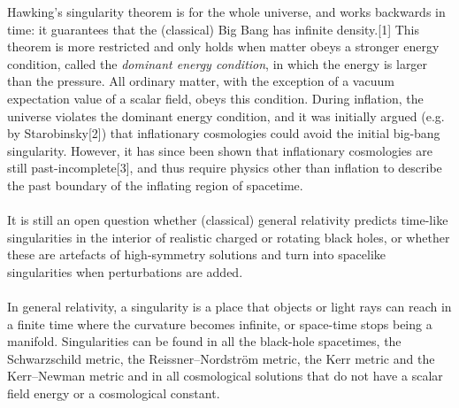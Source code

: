  Hawking's singularity theorem is for the whole universe, and works backwards in time: it guarantees that the (classical) Big Bang has infinite density.[1] This theorem is more restricted and only holds when matter obeys a stronger energy condition, called the \emph{dominant energy condition}, in which the energy is larger than the pressure. All ordinary matter, with the exception of a vacuum expectation value of a scalar field, obeys this condition. During inflation, the universe violates the dominant energy condition, and it was initially argued (e.g. by Starobinsky[2]) that inflationary cosmologies could avoid the initial big-bang singularity. However, it has since been shown that inflationary cosmologies are still past-incomplete[3], and thus require physics other than inflation to describe the past boundary of the inflating region of spacetime.\\
 \\
 
 It is still an open question whether (classical) general relativity predicts time-like singularities in the interior of realistic charged or rotating black holes, or whether these are artefacts of high-symmetry solutions and turn into spacelike singularities when perturbations are added.\\
 \\
 
 In general relativity, a singularity is a place that objects or light rays can reach in a finite time where the curvature becomes infinite, or space-time stops being a manifold. Singularities can be found in all the black-hole spacetimes, the Schwarzschild metric, the Reissner–Nordström metric, the Kerr metric and the Kerr–Newman metric and in all cosmological solutions that do not have a scalar field energy or a cosmological constant.\\
 \\
 
